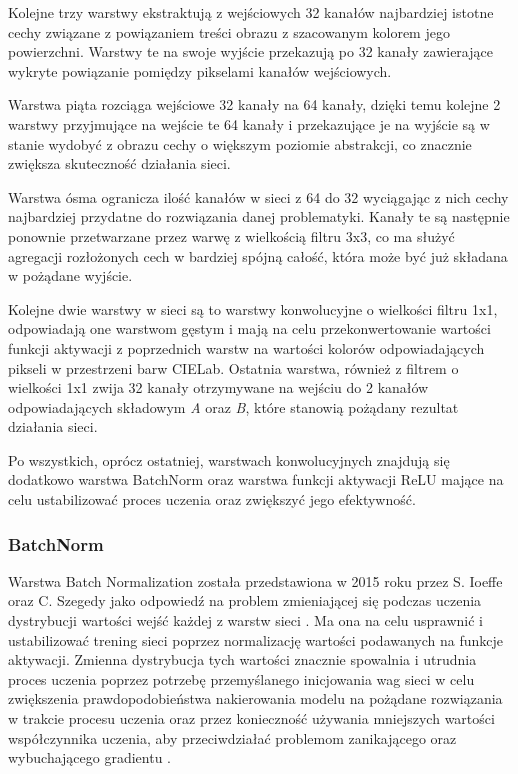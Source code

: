   Kolejne trzy warstwy ekstraktują z wejściowych 32 kanałów najbardziej istotne
  cechy związane z powiązaniem treści obrazu z szacowanym kolorem jego powierzchni.
  Warstwy te na swoje wyjście przekazują po 32 kanały zawierające wykryte
  powiązanie pomiędzy pikselami kanałów wejściowych.

  Warstwa piąta rozciąga wejściowe 32 kanały na 64 kanały, dzięki temu kolejne
  2 warstwy przyjmujące na wejście te 64 kanały i przekazujące je na wyjście są
  w stanie wydobyć z obrazu cechy o większym poziomie abstrakcji, co znacznie
  zwiększa skuteczność działania sieci.

  Warstwa ósma ogranicza ilość kanałów w sieci z 64 do 32 wyciągając z nich
  cechy najbardziej przydatne do rozwiązania danej problematyki. Kanały te są
  następnie ponownie przetwarzane przez warwę z wielkością filtru 3x3, co ma
  służyć agregacji rozłożonych cech w bardziej spójną całość, która może być
  już składana w pożądane wyjście.

  Kolejne dwie warstwy w sieci są to warstwy konwolucyjne o wielkości filtru 1x1,
  odpowiadają one warstwom gęstym i mają na celu przekonwertowanie wartości
  funkcji aktywacji z poprzednich warstw na wartości kolorów odpowiadających
  pikseli w przestrzeni barw CIELab. Ostatnia warstwa, również z filtrem o
  wielkości 1x1 zwija 32 kanały otrzymywane na wejściu do 2 kanałów odpowiadających
  składowym \textit{A} oraz \textit{B}, które stanowią pożądany rezultat działania
  sieci.

  Po wszystkich, oprócz ostatniej, warstwach konwolucyjnych znajdują się dodatkowo
  warstwa BatchNorm oraz warstwa funkcji aktywacji ReLU mające na celu
  ustabilizować proces uczenia oraz zwiększyć jego efektywność.

\subsubsection{BatchNorm} \label{BatchNorm}

  Warstwa Batch Normalization została przedstawiona w 2015 roku przez S. Ioeffe
  oraz C. Szegedy jako odpowiedź
  na problem zmieniającej się podczas uczenia dystrybucji wartości wejść
  każdej z warstw sieci \cite{BatchNorm}. Ma ona na celu usprawnić i ustabilizować
  trening sieci poprzez normalizację wartości podawanych na funkcje aktywacji.
  Zmienna dystrybucja tych wartości znacznie spowalnia i utrudnia proces uczenia
  poprzez potrzebę przemyślanego inicjowania
  wag sieci w celu zwiększenia prawdopodobieństwa nakierowania modelu na pożądane
  rozwiązania w trakcie procesu uczenia oraz przez
  konieczność używania mniejszych wartości współczynnika uczenia, aby
  przeciwdziałać problemom zanikającego oraz wybuchającego gradientu
  \cite{exploding_vanishing_grad}.

